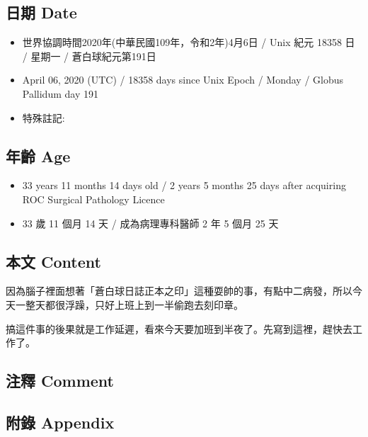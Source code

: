 \documentclass[
]{article}
\providecommand{\tightlist}{%
  \setlength{\itemsep}{0pt}\setlength{\parskip}{0pt}}
\begin{document}
\hypertarget{ux65e5ux671f-date-5}{%
\subsection{日期 Date}\label{ux65e5ux671f-date-5}}

\begin{itemize}
\tightlist
\item
  世界協調時間2020年(中華民國109年，令和2年)4月6日 / Unix 紀元 18358 日
  / 星期一 / 蒼白球紀元第191日
\item
  April 06, 2020 (UTC) / 18358 days since Unix Epoch / Monday / Globus
  Pallidum day 191
\item
  特殊註記:
\end{itemize}

\hypertarget{ux5e74ux9f61-age-5}{%
\subsection{年齡 Age}\label{ux5e74ux9f61-age-5}}

\begin{itemize}
\tightlist
\item
  33 years 11 months 14 days old / 2 years 5 months 25 days after
  acquiring ROC Surgical Pathology Licence
\item
  33 歲 11 個月 14 天 / 成為病理專科醫師 2 年 5 個月 25 天
\end{itemize}

\hypertarget{ux672cux6587-content-5}{%
\subsection{本文 Content}\label{ux672cux6587-content-5}}

因為腦子裡面想著「蒼白球日誌正本之印」這種耍帥的事，有點中二病發，所以今天一整天都很浮躁，只好上班上到一半偷跑去刻印章。

搞這件事的後果就是工作延遲，看來今天要加班到半夜了。先寫到這裡，趕快去工作了。

\hypertarget{ux6ce8ux91cb-comment-5}{%
\subsection{注釋 Comment}\label{ux6ce8ux91cb-comment-5}}

\hypertarget{ux9644ux9304-appendix-5}{%
\subsection{附錄 Appendix}\label{ux9644ux9304-appendix-5}}
\end{document}
